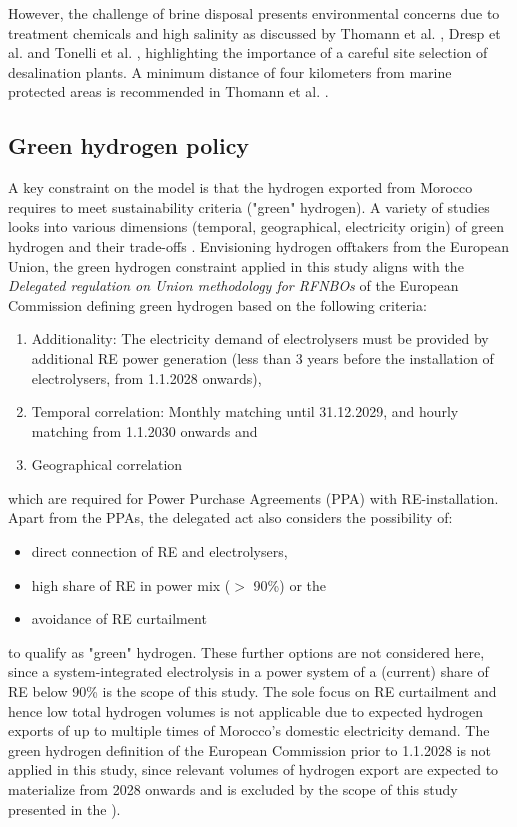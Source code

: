 However, the challenge of brine disposal presents environmental concerns due to treatment chemicals and high salinity as discussed by Thomann et al. \cite{Thomann2022}, Dresp et al. \cite{Dresp2019} and Tonelli et al. \cite{Tonelli2023}, highlighting the importance of a careful site selection of desalination plants. A minimum distance of four kilometers from marine protected areas is recommended in Thomann et al. \cite{Thomann2022}.



\subsection*{Green hydrogen policy}
\label{subsec:green_hydrogen_constraint}


A key constraint on the model is that the hydrogen exported from Morocco requires to meet sustainability criteria ("green" hydrogen). A variety of studies looks into various dimensions (temporal, geographical, electricity origin) of green hydrogen and their trade-offs \cite{Brauer2022, Ruhnau2022, Zeyen2024}.
Envisioning hydrogen offtakers from the European Union, the green hydrogen constraint applied in this study aligns with the \emph{Delegated regulation on Union methodology for RFNBOs} of the European Commission \cite{Commission2023} defining green hydrogen  based on the following criteria:

\begin{enumerate}
    \item Additionality: The electricity demand of electrolysers must be provided by additional RE power generation (less than 3 years before the installation of electrolysers, from 1.1.2028 onwards),
    \item Temporal correlation: Monthly matching until 31.12.2029, and hourly matching from 1.1.2030 onwards and
    \item Geographical correlation
\end{enumerate}
which are required for Power Purchase Agreements (PPA) with RE-installation. Apart from the PPAs, the delegated act also considers the possibility of:
\begin{itemize}
    \item direct connection of RE and electrolysers,
    \item high share of RE in power mix ($>$ 90\%) or the
    \item avoidance of RE curtailment
\end{itemize}
to qualify as "green" hydrogen. These further options are not considered here, since a system-integrated electrolysis in a power system of a (current) share of RE below 90\% is the scope of this study. The sole focus on RE curtailment and hence low total hydrogen volumes is not applicable due to expected hydrogen exports of up to multiple times of Morocco's domestic electricity demand. The green hydrogen definition of the European Commission prior to 1.1.2028 is not applied in this study, since relevant volumes of hydrogen export are expected to materialize from 2028 onwards and is excluded by the scope of this study presented in the ).


